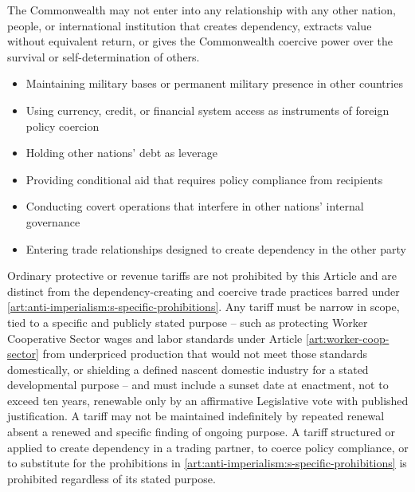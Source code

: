 
The Commonwealth may not enter into any relationship with any other nation, people, or international institution that creates dependency, extracts value without equivalent return, or gives the Commonwealth coercive power over the survival or self-determination of others.

\begin{itemize}
  \item Maintaining military bases or permanent military presence in other countries
  \item Using currency, credit, or financial system access as instruments of foreign policy coercion
  \item Holding other nations' debt as leverage
  \item Providing conditional aid that requires policy compliance from recipients
  \item Conducting covert operations that interfere in other nations' internal governance
  \item Entering trade relationships designed to create dependency in the other party
\end{itemize}

Ordinary protective or revenue tariffs are not prohibited by this Article and are distinct from the dependency-creating and coercive trade practices barred under \ref{art:anti-imperialism:s-specific-prohibitions}. Any tariff must be narrow in scope, tied to a specific and publicly stated purpose -- such as protecting Worker Cooperative Sector wages and labor standards under Article \ref{art:worker-coop-sector} from underpriced production that would not meet those standards domestically, or shielding a defined nascent domestic industry for a stated developmental purpose -- and must include a sunset date at enactment, not to exceed ten years, renewable only by an affirmative Legislative vote with published justification. A tariff may not be maintained indefinitely by repeated renewal absent a renewed and specific finding of ongoing purpose. A tariff structured or applied to create dependency in a trading partner, to coerce policy compliance, or to substitute for the prohibitions in \ref{art:anti-imperialism:s-specific-prohibitions} is prohibited regardless of its stated purpose.

